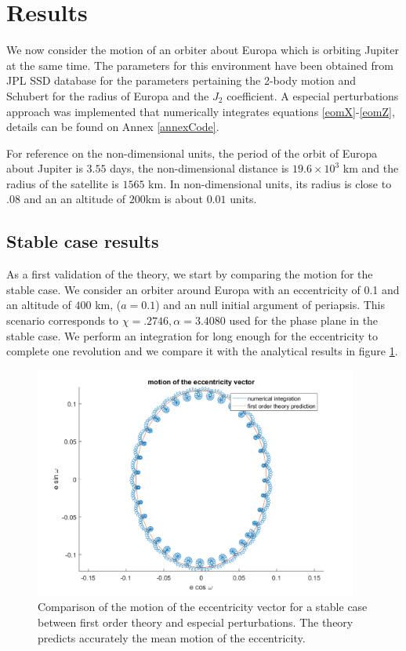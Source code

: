 \section{Results}

We now consider the motion of an orbiter about Europa which is orbiting Jupiter at the same time. The parameters for this environment have been obtained from JPL SSD database \cite{jplssd} for the parameters pertaining the 2-body motion and Schubert \cite{schubert2004interior} for the radius of Europa and the $J_2$ coefficient. A especial perturbations approach was implemented that numerically integrates equations \ref{eomX}-\ref{eomZ}, details can be found on Annex \ref{annexCode}.

For reference on the non-dimensional units, the period of the orbit of Europa about Jupiter is $3.55$ days, the non-dimensional distance is $19.6 \times 10^3$ km and the radius of the satellite is $1565$ km. In non-dimensional units, its radius is close to $.08$ and an an altitude of $200$km is about $0.01$ units.

\subsection{Stable case results}
As a first validation of the theory, we start by comparing the motion for the stable case. We consider an orbiter around Europa with an eccentricity of 0.1 and an altitude of $400$ km, ($a=0.1$) and an null initial argument of periapsis. This scenario corresponds to $\chi = .2746, \alpha = 3.4080$ used for the phase plane in the stable case. We perform an integration for long enough for the eccentricity to complete one revolution and we compare it with the analytical results in figure \ref{fig:stableEccentricityComparison}.

\begin{figure}[H]
	\centering
	\includegraphics[height=3in]
	{figures/Europe400km01e30i/eccentricityComparison.png}
	\caption{Comparison of the motion of the eccentricity vector for a stable case between first order theory and especial perturbations. The theory predicts accurately the mean motion of the eccentricity.}
	\label{fig:stableEccentricityComparison}
\end{figure}

